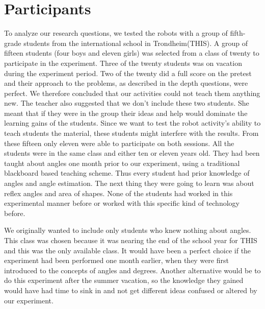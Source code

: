 \chapter{Participants}
To analyze our research questions, we tested the robots with a group of fifth-grade students from the international school in Trondheim(THIS). A group of fifteen students (four boys and eleven girls) was selected from a class of twenty to participate in the experiment. Three of the twenty students was on vacation during the experiment period. Two of the twenty did a full score on the pretest and their approach to the problems, as described in the depth questions, were perfect. We therefore concluded that our activities could not teach them anything new. The teacher also suggested that we don't include these two students. She meant that if they were in the group their ideas and help would dominate the learning gains of the students. Since we want to test the robot activity's ability to teach students the material, these students might interfere with the results. From these fifteen only eleven were able to participate on both sessions. 
All the students were in the same class and either ten or eleven years old. They had been taught about angles one month prior to our experiment, using a traditional blackboard based teaching scheme. Thus every student had prior knowledge of angles and angle estimation. The next thing they were going to learn was about reflex angles and area of shapes. None of the students had worked in this experimental manner before or worked with this specific kind of technology before.

\bigskip\noindent
We originally wanted to include only students who knew nothing about angles. This class was chosen because it was nearing the end of the school year for THIS and this was the only available class. It would have been a perfect choice if the experiment had been performed one month earlier, when they were first introduced to the concepts of angles and degrees. Another alternative would be to do this experiment after the summer vacation, so the knowledge they gained would have had time to sink in and not get different ideas confused or altered by our experiment. 